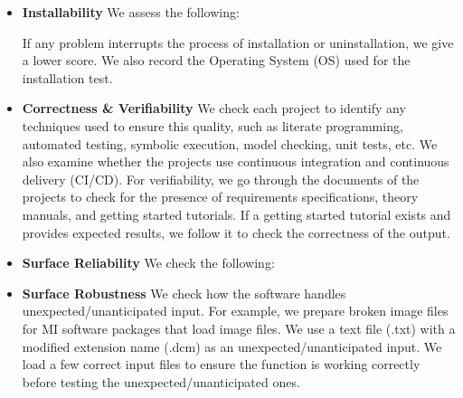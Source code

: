 \documentclass[final, 3p, times, authoryear]{elsarticle}
\begin{document}
\begin{itemize}

\item \textbf{Installability} We assess the following: 
If any problem interrupts the process of installation or uninstallation, we give
a lower score. We also record the Operating System (OS) used for the
installation test.

\item \textbf{Correctness \& Verifiability} We check each project to identify
any techniques used to ensure this quality, such as literate programming,
automated testing, symbolic execution, model checking, unit tests, etc. We also
examine whether the projects use continuous integration and continuous delivery
(CI/CD). For verifiability, we go through the documents of the projects to check
for the presence of requirements specifications, theory manuals, and getting
started tutorials. If a getting started tutorial exists and provides expected
results, we follow it to check the correctness of the output.

\item \textbf{Surface Reliability} We check the following: 

\item \textbf{Surface Robustness} We check how the software handles
unexpected/unanticipated input. For example, we prepare broken image files for
MI software packages that load image files. We use a text file (.txt) with a
modified extension name (.dcm) as an unexpected/unanticipated input. We load a
few correct input files to ensure the function is working correctly before
testing the unexpected/unanticipated ones.


\end{itemize}
\end{document}
